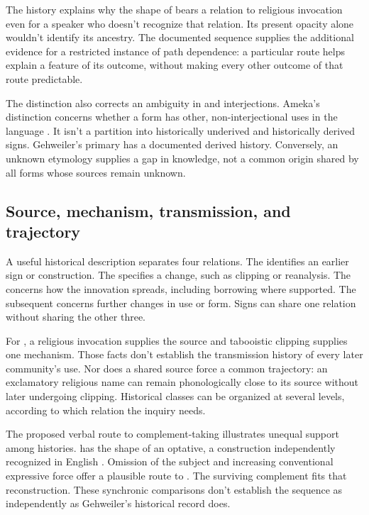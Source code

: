 \documentclass[12pt]{article}
\begin{document}
The history explains why the shape of  bears a relation
to religious invocation even for a speaker who doesn't recognize that
relation. Its present opacity alone wouldn't identify its ancestry.
The documented sequence supplies the additional evidence for a
restricted instance of path dependence: a particular route helps explain
a feature of its outcome, without making every other outcome of that
route predictable.

The distinction also corrects an ambiguity in  and
 interjections. Ameka's distinction concerns whether
a form has other, non-interjectional uses in the language
\citep[105--106]{ameka1992}. It isn't a partition into historically
underived and historically derived signs. Gehweiler's primary
 has a documented derived history. Conversely, an unknown
etymology supplies a gap in knowledge, not a common origin shared by
all forms whose sources remain unknown.

\subsection{Source, mechanism, transmission, and trajectory}

A useful historical description separates four relations. The
 identifies an earlier sign or construction. The
 specifies a change, such as clipping or reanalysis.
The  concerns how the innovation spreads,
including borrowing where supported. The subsequent 
concerns further changes in use or form. Signs can share one relation
without sharing the other three.

For , a religious invocation supplies the source and
tabooistic clipping supplies one mechanism. Those facts don't establish
the transmission history of every later community's use. Nor does a
shared source force a common trajectory: an exclamatory religious name
can remain phonologically close to its source without later undergoing
clipping. Historical classes can be organized at several
levels, according to which relation the inquiry needs.

The proposed verbal route to complement-taking  illustrates
unequal support among histories.  has the shape
of an optative, a construction independently recognized in English
\citep[944]{HuddlestonPullum2002}. Omission of the subject and increasing
conventional expressive force offer a plausible route to . The surviving complement fits that reconstruction. These synchronic
comparisons don't establish the sequence as independently as Gehweiler's
historical record does.
\end{document}
